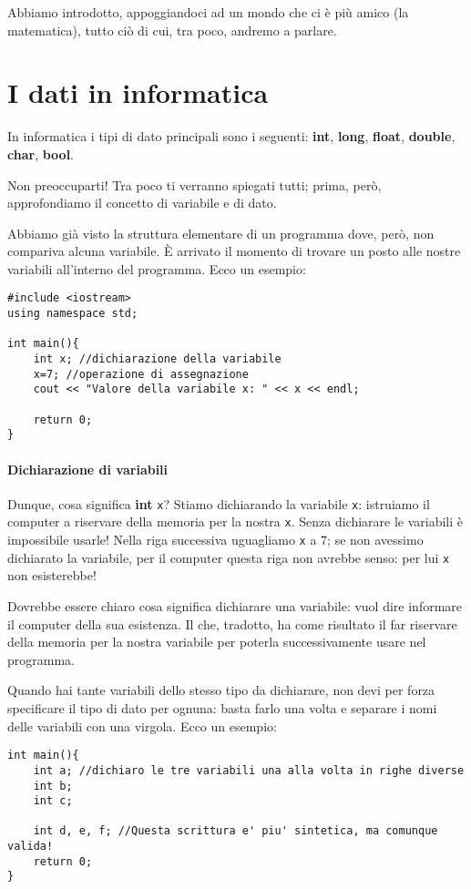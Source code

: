 	Abbiamo introdotto, appoggiandoci ad un mondo che ci è più amico (la matematica), tutto ciò di cui, tra poco, andremo a parlare.
	
	\section{I dati in informatica}
	
	In informatica i tipi di dato principali sono i seguenti: \textbf{int}, \textbf{long}, \textbf{float}, \textbf{double}, \textbf{char}, \textbf{bool}.
	
	Non preoccuparti! Tra poco ti verranno spiegati tutti; prima, però, approfondiamo il concetto di variabile e di dato.
	
	Abbiamo già visto la struttura elementare di un programma dove, però, non compariva alcuna variabile. \`E arrivato il momento di trovare un posto alle nostre variabili all'interno del programma. Ecco un esempio:
	
	\begin{lstlisting}
#include <iostream>
using namespace std;
		
int main(){
	int x; //dichiarazione della variabile
	x=7; //operazione di assegnazione
	cout << "Valore della variabile x: " << x << endl;
	
	return 0;
}
\end{lstlisting}
	\paragraph{Dichiarazione di variabili}Dunque, cosa significa \textbf{int} \verb|x|? Stiamo dichiarando la variabile \verb|x|: istruiamo il computer a riservare della memoria per la nostra \verb|x|. Senza dichiarare le variabili è impossibile usarle! Nella riga successiva uguagliamo \verb|x| a $7$; se non avessimo dichiarato la variabile, per il computer questa riga non avrebbe senso: per lui \verb|x| non esisterebbe!
	
	Dovrebbe essere chiaro cosa significa dichiarare una variabile: vuol dire informare il computer della sua esistenza.  Il che, tradotto, ha come risultato il far riservare della memoria per la nostra variabile per poterla successivamente usare nel programma.
	
	Quando hai tante variabili dello stesso tipo da dichiarare, non devi per forza specificare il tipo di dato per ognuna: basta farlo una volta e separare i nomi delle variabili con una virgola. Ecco un esempio:
	\begin{lstlisting}
int main(){
	int a; //dichiaro le tre variabili una alla volta in righe diverse
	int b;
	int c;
	
	int d, e, f; //Questa scrittura e' piu' sintetica, ma comunque valida!
	return 0;
}
	\end{lstlisting}
	
